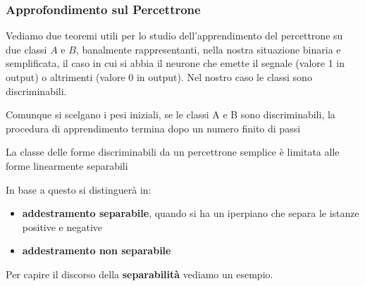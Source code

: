 \subsubsection{Approfondimento sul Percettrone}
Vediamo due teoremi utili per lo studio dell'apprendimento del percettrone su due classi $A$ e $B$, banalmente rappresentanti, nella nostra situazione binaria e semplificata, il caso in cui si abbia il neurone che emette il segnale (valore 1 in output) o altrimenti (valore 0 in output). Nel nostro caso le classi sono discriminabili.
\begin{definizione}
	Comunque si scelgano i pesi iniziali, se le classi A e B sono discriminabili,
	la procedura di apprendimento termina dopo un numero finito di passi
\end{definizione}
\begin{definizione}
	La classe delle forme discriminabili da un percettrone semplice è
	limitata alle forme linearmente separabili
\end{definizione}
In base a questo si distinguerà in:
\begin{itemize}
	\item \textbf{addestramento separabile}, quando si ha un iperpiano che separa
	      le istanze positive e negative
	\item \textbf{addestramento non separabile}
\end{itemize}
Per capire il discorso della \textbf{separabilità} vediamo un esempio.
